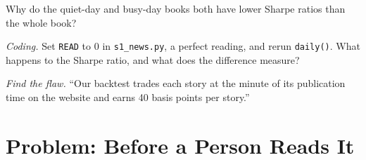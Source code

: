 \begin{exercise}[$\star\star$]\label{exo:s1:news-and-events:6}
Why do the quiet-day and busy-day books both have lower Sharpe ratios than the whole book?
\end{exercise}

\begin{exercise}[$\star\star\star$]\label{exo:s1:news-and-events:7}
\emph{Coding.} Set \texttt{READ} to 0 in \texttt{s1\_news.py}, a perfect reading, and rerun \texttt{daily()}. What happens to the Sharpe ratio, and what does
the difference measure?
\end{exercise}

\begin{exercise}[$\star\star\star$]\label{exo:s1:news-and-events:8}
\emph{Find the flaw.} ``Our backtest trades each story at the minute of its publication time on the website and earns 40 basis points per story.''
\end{exercise}

\section{Problem: Before a Person Reads It}

